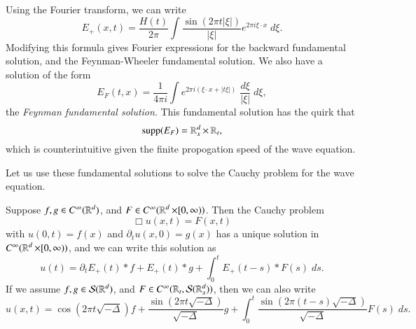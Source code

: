 Using the Fourier transform, we can write
%
\[ E_+(x,t) = \frac{H(t)}{2 \pi} \int \frac{\sin(2 \pi t |\xi|)}{|\xi|} e^{2 \pi i \xi \cdot x}\; d\xi. \]
%
Modifying this formula gives Fourier expressions for the backward fundamental solution, and the Feynman-Wheeler fundamental solution. We also have a solution of the form
%
\[ E_F(t,x) = \frac{1}{4 \pi i} \int e^{2 \pi i (\xi \cdot x + |t \xi|)}\; \frac{d\xi}{|\xi|}\; d\xi, \]
%
the \emph{Feynman fundamental solution}. This fundamental solution has the quirk that
%
\[ \text{supp}(E_F) = \operatorname{\mathbb{R}}^d_x \times \operatorname{\mathbb{R}}_t, \]
%
which is counterintuitive given the finite propogation speed of the wave equation.

Let us use these fundamental solutions to solve the Cauchy problem for the wave equation.

\begin{theorem}
    Suppose $f,g \in C^\infty(\operatorname{\mathbb{R}}^d)$, and $F \in C^\infty(\operatorname{\mathbb{R}}^d \times [0,\infty))$. Then the Cauchy problem
    \[ \Box u(x,t) = F(x,t) \]
    with $u(0,t) = f(x)$ and $\partial_t u(x,0) = g(x)$ has a unique solution in $C^\infty(\operatorname{\mathbb{R}}^d \times [0,\infty))$, and we can write this solution as
    \[ u(t) = \partial_t E_+(t) * f + E_+(t) * g + \int_0^t E_+(t-s) * F(s)\; ds. \]
    If we assume $f,g \in \mathcal{S}(\operatorname{\mathbb{R}}^d)$, and $F \in C^\infty(\operatorname{\mathbb{R}}_t, \mathcal{S}(\operatorname{\mathbb{R}}^d_x))$, then we can also write
    \[ u(x,t) = \cos(2 \pi t \sqrt{-\Delta}) f + \frac{\sin(2 \pi t \sqrt{-\Delta})}{\sqrt{-\Delta}} g + \int_0^t \frac{\sin(2 \pi (t - s) \sqrt{-\Delta})}{\sqrt{-\Delta}} F(s)\; ds. \]
\end{theorem}
